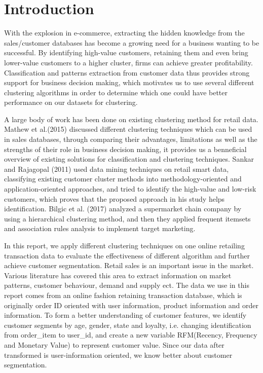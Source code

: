 \documentclass[a4paper,12pt,fleqn]{article}
\begin{document}
\section{Introduction}
With the explosion in e-commerce, extracting the hidden knowledge from the sales/customer databases has become a growing need for a business wanting to be successful. By identifying high-value customers, retaining them and even bring lower-value customers to a higher cluster, firms can achieve greater profitability. Classification and patterns extraction from customer data thus provides strong support for business decision making, which motivates us to use several different clustering algorithms in order to determine which one could have better performance on our datasets for clustering.

A large body of work has been done on existing clustering method for retail data. Mathew et al.(2015) discussed different clustering techniques which can be used in sales databases, through comparing their advantages, limitations as well as the strengths of their role in business decision making, it provides us a benneficial overview of existing solutions for classification and clustering techniques. Sankar and Rajagopal (2011) used data mining techniques on retail smart data, classifying existing customer cluster  methods into methodology-oriented and application-oriented approaches, and tried to identify the high-value and low-risk customers, which proves that the proposed approach in his study helps identification. Bilgic et al. (2017) analyzed a supermarket chain company by using a hierarchical clustering method, and then they applied frequent itemsets and association rules analysis to implement target marketing.

In this report, we apply different clustering techniques on one online retailing transaction data to evaluate the effectiveness of different algorithm and further achieve customer segmentation. Retail sales is an important issue in the market. Various literature has covered this area to extract information on market patterns, customer behaviour, demand and supply ect. The data we use in this report comes from an online fashion retaining transaction database, which is originally order ID oriented with user information, product information and order information. To form a better understanding of customer features, we identify customer segments by age, gender, state and loyalty, i.e. changing identification from order\_item to user\_id, and create a new variable RFM(Recency, Frequency and Monetary Value) to represent customer value. Since our data after transformed is user-information oriented, we know better about customer segmentation.
\end{document}
